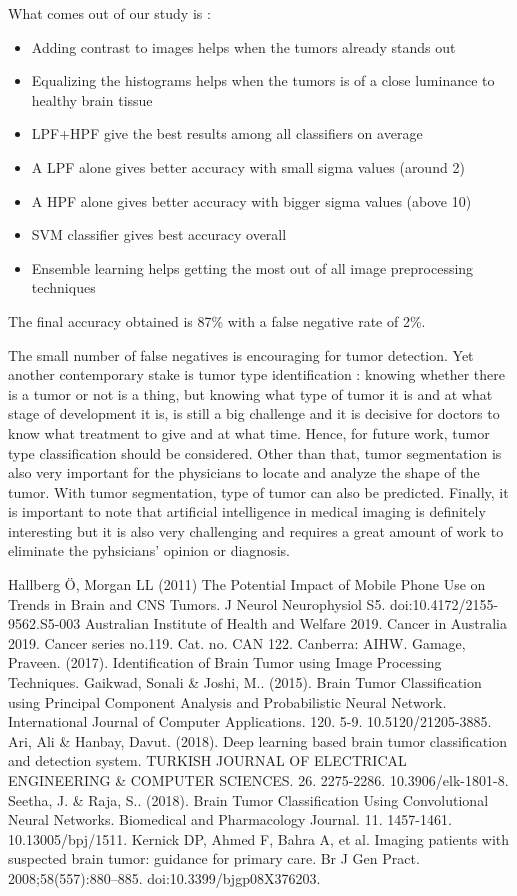 \documentclass[conference]{IEEEtran}
\begin{document}
What comes out of our study is :
\begin{itemize}
\item Adding contrast to images helps when the tumors already stands out
\item Equalizing the histograms helps when the tumors is of a close luminance to healthy brain tissue
\item LPF+HPF give the best results among all classifiers on average
\item A LPF alone gives better accuracy with small sigma values (around 2)
\item A HPF alone gives better accuracy with bigger sigma values (above 10)
\item SVM classifier gives best accuracy overall
\item Ensemble learning helps getting the most out of all image preprocessing techniques
\end{itemize}
The final accuracy obtained is 87\% with a false negative rate of 2\%.

The small number of false negatives is encouraging for tumor detection. Yet another contemporary stake is tumor type identification : knowing whether there is a tumor or not is a thing, but knowing what type of tumor it is and at what stage of development it is, is still a big challenge and it is decisive for doctors to know what treatment to give and at what time. Hence, for future work, tumor type classification should be considered. Other than that, tumor segmentation is also very important for the physicians to locate and analyze the shape of the tumor. With tumor segmentation, type of tumor can also be predicted. Finally, it is important to note that artificial intelligence in medical imaging is definitely interesting but it is also very challenging and requires a great amount of work to eliminate the pyhsicians' opinion or diagnosis. 


\begin{thebibliography}{00}
 Hallberg Ö, Morgan LL (2011) The Potential Impact of Mobile Phone Use on Trends in Brain and CNS Tumors. J Neurol Neurophysiol S5. doi:10.4172/2155-9562.S5-003
 Australian Institute of Health and Welfare 2019. Cancer in Australia 2019. Cancer series no.119. Cat. no. CAN 122. Canberra: AIHW.
 Gamage, Praveen. (2017). Identification of Brain Tumor using Image Processing Techniques. 
 Gaikwad, Sonali \& Joshi, M.. (2015). Brain Tumor Classification using Principal Component Analysis and Probabilistic Neural Network. International Journal of Computer Applications. 120. 5-9. 10.5120/21205-3885.
 Ari, Ali \& Hanbay, Davut. (2018). Deep learning based brain tumor classification and detection system. TURKISH JOURNAL OF ELECTRICAL ENGINEERING \& COMPUTER SCIENCES. 26. 2275-2286. 10.3906/elk-1801-8.
 Seetha, J. \& Raja, S.. (2018). Brain Tumor Classification Using Convolutional Neural Networks. Biomedical and Pharmacology Journal. 11. 1457-1461. 10.13005/bpj/1511. 
 Kernick DP, Ahmed F, Bahra A, et al. Imaging patients with suspected brain tumor: guidance for primary care. Br J Gen Pract. 2008;58(557):880–885. doi:10.3399/bjgp08X376203.
\end{thebibliography}
\end{document}
